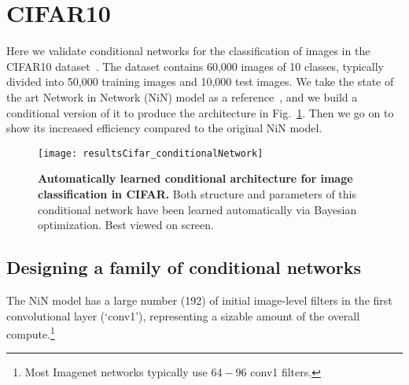 \documentclass[thesis]{subfiles}
\begin{document}

\section{CIFAR10}
Here we validate conditional networks for the classification of images in the CIFAR10 dataset~\cite{CIFAR10}. 
The dataset contains 60,000 images of 10 classes, typically divided into 50,000 training images and 10,000 test images. 
We take the state of the art Network in Network (NiN) model 
as a reference~\cite{Lin2013NiN}, and we build a conditional version of it to produce the architecture in Fig.~\ref{fig:Cifar_CondNet}. 
Then we go on to show its increased efficiency compared to the original NiN model.

\begin{figure}[t]
\centerline{
\texttt{[image: resultsCifar\_conditionalNetwork]}
}
   \caption{{\bf Automatically learned conditional architecture for image classification in CIFAR.} Both structure and parameters of this conditional network have been learned automatically via Bayesian optimization.
Best viewed on screen.}
\label{fig:Cifar_CondNet}
\end{figure}

\subsection{Designing a family of conditional networks}
The NiN model has a large number (192) of initial image-level filters in the first convolutional layer (`conv1'), 
representing a sizable amount of the overall compute.\footnote{Most Imagenet networks typically use $64-96$ conv1 filters.}
\end{document}
